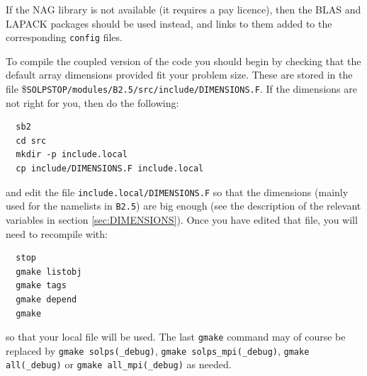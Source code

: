 \documentclass[a4paper,10pt]{report}
\begin{document}
If the NAG library is not available (it requires a pay licence), then the BLAS and
LAPACK packages should be used instead, and links to them added to the corresponding {\tt config} files.

To compile the coupled version of the code you should begin by checking that the default
array dimensions provided fit your problem size. These are stored in the file
\${\tt SOLPSTOP/modules/B2.5/src/include/DIMENSIONS.F}. If the dimensions are not right for you,
then do the following:
\begin{verbatim}
  sb2
  cd src
  mkdir -p include.local
  cp include/DIMENSIONS.F include.local
\end{verbatim}
and edit the file {\tt include.local/DIMENSIONS.F} so that the
dimensions (mainly used for the namelists in {\tt B2.5}) are
big enough (see the description of the relevant variables in section \ref{sec:DIMENSIONS}). Once you have edited that file, you will need to recompile with:
\begin{verbatim}
  stop
  gmake listobj
  gmake tags
  gmake depend
  gmake
\end{verbatim}
so that your local file will be used. The last {\tt gmake} command may of
course be replaced by {\tt gmake solps(\_debug)},
{\tt gmake solps\_mpi(\_debug)}, {\tt gmake all(\_debug)} or
{\tt gmake all\_mpi(\_debug)} as needed.
\end{document}
